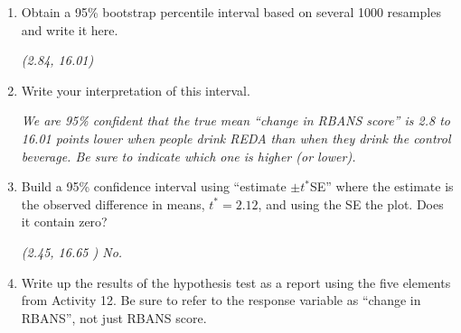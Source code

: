 \begin{enumerate}
\begin{key}
  {\it  I got 1.09 for Control, -7.97 for REDA with difference = -9.06.  }
\end{key}
    \item Obtain a 95\% bootstrap percentile interval based on several
      1000 resamples and write it here.
\begin{students}
    \vspace{2cm}    
\end{students}

\begin{key}
  {\it (2.84, 16.01)  }
\end{key}
    \item Write your interpretation of this interval.
\begin{students}
    \vspace{1cm}    
\end{students}

\begin{key}
  {\it  We are 95\% confident that the true mean ``change in RBANS score''
  is  2.8 to 16.01 points lower when people drink REDA than when they
   drink the control beverage. Be sure to indicate which one is higher
 (or lower). } 
\end{key}
\item Build a 95\% confidence interval using ``estimate $\pm t^*$SE'' where the
  estimate is the observed difference in means, $t^* = 2.12$, and
  using the SE the plot.  Does it contain zero?
 \begin{students}
    \vspace{2cm}    
\end{students}

\begin{key}
  {\it (2.45, 16.65 )  No.}
\end{key}


\item Write up the results of the hypothesis test as a report using
  the five elements from Activity 12.  Be sure to refer to the response
  variable as ``change in RBANS'', not just RBANS score. \\ 

\begin{students}
 \newpage 
\end{students}


\end{enumerate}
